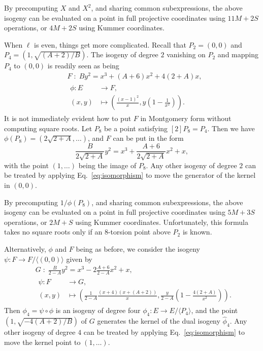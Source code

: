 \documentclass[jmc]{degruyter-journal-a}
\theoremstyle{definition}
\newcommand{\cyc}[1]{{\langle #1 \rangle}}
\begin{document}
By precomputing $X$ and $X^2$, and sharing common subexpressions, the
above isogeny can be evaluated on a point in full projective
coordinates using $11M+2S$ operations, or $4M + 2S$ using Kummer
coordinates.

When $\ell$ is even, things get more complicated. Recall that
$P_2=(0,0)$ and $P_4=(1,\sqrt{(A+2)/B})$. The isogeny of degree $2$
vanishing on $P_2$ and mapping $P_4$ to $(0,0)$ is readily seen as
being
\begin{align}
  \label{eq:isogeny-2}
  &F \;:\;  By^2 = x^3 + (A+6)x^2 + 4(2+A)x,\\
  &\begin{aligned}
    \phi : E &\to F,\\
    (x,y) &\mapsto \left(\frac{(x-1)^2}{x}, y\left(1 - \frac{1}{x^2}\right)\right).
  \end{aligned}
\end{align}
It is not immediately evident how to put $F$ in Montgomery form
without computing square roots. Let $P_8$ be a point satisfying
$[2]P_8=P_4$. Then we have $\phi(P_8)=(2\sqrt{2+A},\ldots)$, and $F$ can be
put in the form
\[\frac{B}{2\sqrt{2+A}}y^2 = x^3 + \frac{A+6}{2\sqrt{2+A}}x^2 + x,\]
with the point $(1,\ldots)$ being the image of $P_8$.  Any other
isogeny of degree $2$ can be treated by applying
Eq.~\eqref{eq:isomorphism} to move the generator of the kernel in
$(0,0)$.

By precomputing $1/\phi(P_8)$, and sharing common subexpressions, the
above isogeny can be evaluated on a point in full projective
coordinates using $5M+3S$ operations, or $2M+S$ using Kummer
coordinates. Unfortunately, this formula takes no square roots only if
an $8$-torsion point above $P_2$ is known.


Alternatively, $\phi$ and $F$ being as before, we consider the isogeny
$\psi:F\to F/\cyc{(0,0)}$ given by
\begin{align}
  \label{eq:isogeny-4}
  &G \;:\;  \frac{B}{2-A}y^2 = x^3 - 2\frac{A+6}{2-A}x^2 + x,\\
  &\begin{aligned}
    \psi : F &\to G,\\
    (x,y) &\mapsto \left(\frac{1}{2-A}\frac{(x+4)(x+(A+2))}{x}, \frac{y}{2-A}\left(1 - \frac{4(2+A)}{x^2}\right)\right).
  \end{aligned}
\end{align}
Then $\phi_4 = \psi\circ\phi$ is an isogeny of degree four
$\phi_4\colon E\to
E/\cyc{P_4}$, and the point $\left(1,\sqrt{-4(A+2)/B}\right)$ of $G$
generates the kernel of the dual isogeny $\hat{\phi}_4$. Any other
isogeny of degree $4$ can be treated by applying
Eq.~\eqref{eq:isomorphism} to move the kernel point to $(1,\ldots)$.
\end{document}
